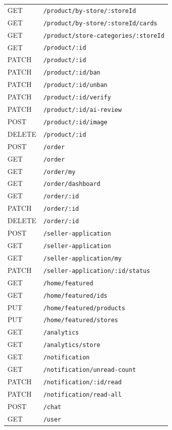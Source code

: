 \documentclass[12pt, a4paper, oneside]{report}
\begin{document}
\begin{longtable}{|>{\raggedright\arraybackslash}p{1.8cm}|>{\raggedright\arraybackslash}p{11cm}|}
GET & \texttt{/product/by-store/:storeId} \\
GET & \texttt{/product/by-store/:storeId/cards} \\
GET & \texttt{/product/store-categories/:storeId} \\
GET & \texttt{/product/:id} \\
PATCH & \texttt{/product/:id} \\
PATCH & \texttt{/product/:id/ban} \\
PATCH & \texttt{/product/:id/unban} \\
PATCH & \texttt{/product/:id/verify} \\
PATCH & \texttt{/product/:id/ai-review} \\
POST & \texttt{/product/:id/image} \\
DELETE & \texttt{/product/:id} \\
\hline
POST & \texttt{/order} \\
GET & \texttt{/order} \\
GET & \texttt{/order/my} \\
GET & \texttt{/order/dashboard} \\
GET & \texttt{/order/:id} \\
PATCH & \texttt{/order/:id} \\
DELETE & \texttt{/order/:id} \\
\hline
POST & \texttt{/seller-application} \\
GET & \texttt{/seller-application} \\
GET & \texttt{/seller-application/my} \\
PATCH & \texttt{/seller-application/:id/status} \\
\hline
GET & \texttt{/home/featured} \\
GET & \texttt{/home/featured/ids} \\
PUT & \texttt{/home/featured/products} \\
PUT & \texttt{/home/featured/stores} \\
\hline
GET & \texttt{/analytics} \\
GET & \texttt{/analytics/store} \\
\hline
GET & \texttt{/notification} \\
GET & \texttt{/notification/unread-count} \\
PATCH & \texttt{/notification/:id/read} \\
PATCH & \texttt{/notification/read-all} \\
\hline
POST & \texttt{/chat} \\
\hline
GET & \texttt{/user} \\

\end{longtable}
\end{document}
